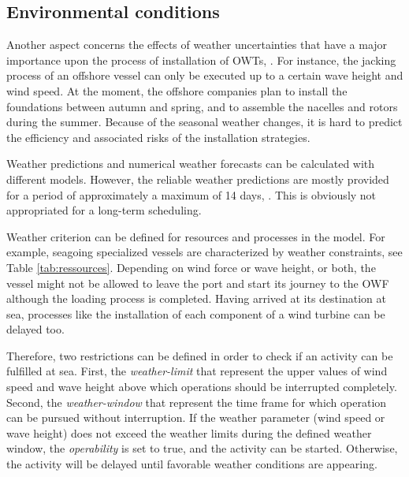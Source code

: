\subsection{Environmental conditions}
Another aspect concerns the effects of weather uncertainties that have a major importance upon the process of installation of OWTs, \cite{COMPIT11}. For instance, the jacking process of an offshore vessel can only be executed up to a certain wave height and wind speed. At the moment, the offshore companies plan to install the foundations between autumn and spring, and to assemble the nacelles and rotors during the summer. Because of the seasonal weather changes, it is hard to predict the efficiency and associated risks of the installation strategies.

Weather predictions and numerical weather forecasts can be calculated with different models. However, the reliable weather predictions are mostly provided for a period of approximately a maximum of 14 days, \cite{Hinnenthal_2010}. This is obviously not appropriated for a long-term scheduling.

Weather criterion can be defined for resources and processes in the model. For example, seagoing specialized vessels are characterized by weather constraints, see Table \ref{tab:ressources}. Depending on wind force or wave height, or both, the vessel might not be allowed to leave the port and start its journey to the OWF although the loading process is completed. Having arrived at its destination at sea, processes like the installation of each component of a wind turbine can be delayed too.

Therefore, two restrictions can be defined in order to check if an activity can be fulfilled at sea. First, the \textit{weather-limit} that represent the upper values of wind speed and wave height above which operations should be interrupted completely. Second, the \textit{weather-window} that represent the time frame for which operation can be pursued without interruption.  If the weather parameter (wind speed or wave height) does not exceed the weather limits during the defined weather window, the \textit{operability} is set to true, and the activity can be started. Otherwise, the activity will be delayed until favorable weather conditions are appearing.

